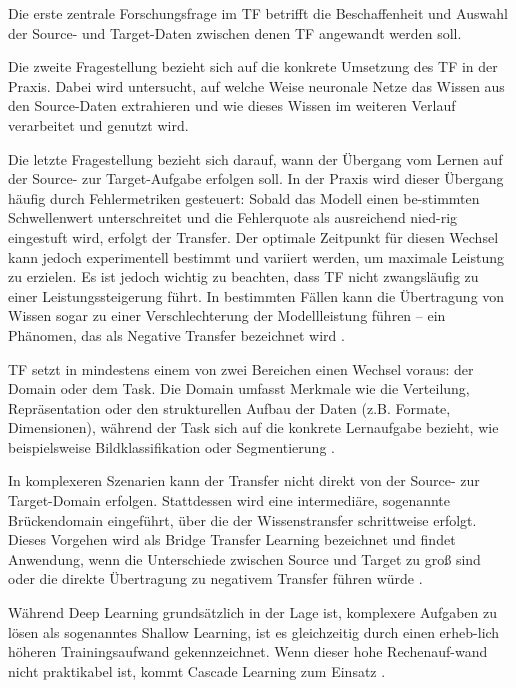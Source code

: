 Die erste zentrale Forschungsfrage im TF betrifft die Beschaffenheit und Auswahl der Source- und Target-Daten zwischen denen TF 
angewandt werden soll. 

Die zweite Fragestellung bezieht sich auf die konkrete Umsetzung des TF in der Praxis. Dabei wird untersucht, auf welche Weise neuronale Netze 
das Wissen aus den Source-Daten extrahieren und wie dieses Wissen im weiteren Verlauf verarbeitet und genutzt wird.

Die letzte Fragestellung bezieht sich darauf, wann der Übergang vom Lernen auf der Source- zur 
Target-Aufgabe erfolgen soll. In der Praxis wird dieser Übergang häufig durch Fehlermetriken gesteuert: Sobald das Modell einen be-stimmten 
Schwellenwert unterschreitet und die Fehlerquote als ausreichend nied-rig eingestuft wird, erfolgt der Transfer. Der optimale 
Zeitpunkt für diesen Wechsel kann jedoch experimentell bestimmt und variiert werden, um maximale Leistung zu erzielen. Es ist jedoch wichtig 
zu beachten, dass TF nicht zwangsläufig zu einer Leistungssteigerung führt. In bestimmten Fällen kann die Übertragung von Wissen 
sogar zu einer Verschlechterung der Modellleistung führen – ein Phänomen, das als Negative Transfer bezeichnet wird \cite{survey_transfer}.

TF setzt in mindestens einem von zwei Bereichen einen Wechsel voraus: der Domain oder dem Task. Die Domain umfasst Merkmale 
wie die Verteilung, Repräsentation oder den strukturellen Aufbau der Daten (z.B. Formate, Dimensionen), während der Task sich auf die konkrete 
Lernaufgabe bezieht, wie beispielsweise Bildklassifikation oder Segmentierung \cite{survey_transfer}.

In komplexeren Szenarien kann der Transfer nicht direkt von der Source- zur Target-Domain erfolgen. Stattdessen wird eine intermediäre, sogenannte 
Brückendomain eingeführt, über die der Wissenstransfer schrittweise erfolgt. Dieses Vorgehen wird als Bridge Transfer Learning 
bezeichnet und findet Anwendung, wenn die Unterschiede zwischen Source und Target zu groß sind oder die direkte Übertragung zu 
negativem Transfer führen würde \cite{bridge_transfer, survey_transfer}.

Während Deep Learning grundsätzlich in der Lage ist, komplexere Aufgaben zu lösen als sogenanntes Shallow Learning, ist es gleichzeitig durch 
einen erheb-lich höheren Trainingsaufwand gekennzeichnet. Wenn dieser hohe Rechenauf-wand nicht praktikabel ist, kommt Cascade Learning zum 
Einsatz \cite{cascor}.

